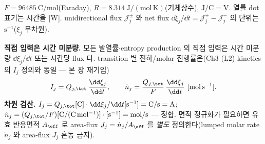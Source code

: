 $F=96485\ \mathrm{C/mol}$(Faraday), $R=8.314\ \mathrm{J/(mol\,K)}$(기체상수), $\mathrm{J/C}=\mathrm V$. 열률 dot
표기는 시간율 [W]. unidirectional flux $\mathcal J_j^\pm$ 와 net flux $\dd\xi_j/\dd t=\mathcal J_j^+-\mathcal J_j^-$
의 단위는 $\mathrm{s^{-1}}$($\xi_j$ 무차원).

\textbf{직접 입력은 시간 미분량.} 모든 발열률$\cdot$entropy production 의 직접 입력은 시간 미분량 $\dd\xi_j/\dd t$
또는 시간당 flux 다. transition 별 전하/molar 진행률은(Ch3 (L2) kinetics 의 $I_j$ 정의와 동일 — 본 장 재기입)
\begin{equation}
I_j=Q_{j,\tot}\,\frac{\dd\xi_j}{\dd t},\qquad
\dot n_j=\frac{Q_{j,\tot}}{F}\,\frac{\dd\xi_j}{\dd t}\ [\mathrm{mol\,s^{-1}}].
\label{eq:ch4_Ij}
\end{equation}
\textbf{차원 검산.} $I_j=Q_{j,\tot}[\mathrm C]\cdot\dd\xi_j/\dd t[\mathrm{s^{-1}}]=\mathrm{C/s}=\mathrm A$;
$\dot n_j=(Q_{j,\tot}/F)[\mathrm{C}/(\mathrm{C\,mol^{-1}})]\cdot[\mathrm{s^{-1}}]=\mathrm{mol/s}$ — 정합. 면적
정규화가 필요하면 유효 반응면적 $A_{\eff}$ 로 area-flux $J_j=\dot n_j/A_{\eff}$ 를 \emph{별도} 정의한다(lumped
molar rate $\dot n_j$ 와 area-flux $J_j$ 혼동 금지).

